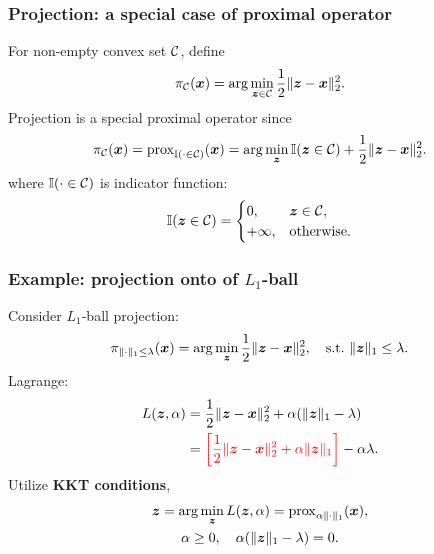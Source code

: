 \documentclass{beamer}
\begin{document}
\begin{frame}[fragile]
    \frametitle{Projection: a special case of proximal operator}
    For non-empty convex set ${\mathcal C}$, define
    \begin{equation}
        \pi_{{\mathcal C}}({\bm x})=\arg\min_{{\bm z}\in{\mathcal C}}\frac12\|{\bm z}-{\bm x}\|_2^2.
    \end{equation}
    Projection is a special proximal operator since
    \begin{equation}
        \pi_{{\mathcal C}}({\bm x})=\mathrm{prox}_{{\mathbb I}(\cdot\in{\mathcal C})}({\bm x})=\arg\min_{{\bm z}}{\mathbb I}({\bm z}\in{\mathcal C})+\frac12\|{\bm z}-{\bm x}\|_2^2.
    \end{equation}
    where ${\mathbb I}(\cdot\in{\mathcal C})$ is indicator function:
    \begin{equation}
        {\mathbb I}({\bm z}\in{\mathcal C})=\begin{cases}
            0,      &{\bm z}\in{\mathcal C},\\
            +\infty,&\mathrm{otherwise}.
        \end{cases}
    \end{equation}
\end{frame}

\begin{frame}[fragile]
    \frametitle{Example: projection onto of $L_1$-ball}
    Consider $L_1$-ball projection:
    \begin{equation}
        \pi_{\|\cdot\|_1\leq\lambda}({\bm x})=\arg\min_{{\bm z}}\frac12\|{\bm z}-{\bm x}\|_2^2,\quad\mathrm{s.t.}~ \|{\bm z}\|_1\leq\lambda.
    \end{equation}
    Lagrange:
    \begin{align}
        L({\bm z},\alpha)
        &=\frac12\|{\bm z}-{\bm x}\|_2^2+\alpha(\|{\bm z}\|_1-\lambda)\\
        &={\color{red}\left[\frac12\|{\bm z}-{\bm x}\|_2^2+\alpha\|{\bm z}\|_1\right]}-\alpha\lambda.
    \end{align}
    Utilize \textbf{KKT conditions},
    \begin{gather}
        {\bm z}=\arg\min_{{\bm z}}L({\bm z},\alpha)=\mathrm{prox}_{\alpha\|\cdot\|_1}({\bm x}),\\
        \alpha\geq 0,\quad\alpha(\|{\bm z}\|_1-\lambda)=0.
    \end{gather}
    \vspace{15pt}
\end{frame}
\end{document}
